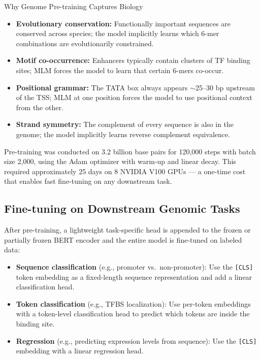 ﻿\documentclass[12pt,a4paper]{article}
\begin{document}
\begin{infobox}{Why Genome Pre-training Captures Biology}
\begin{itemize}[leftmargin=*, itemsep=4pt]
  \item \textbf{Evolutionary conservation:} Functionally important sequences are conserved across species; the model implicitly learns which 6-mer combinations are evolutionarily constrained.
  \item \textbf{Motif co-occurrence:} Enhancers typically contain clusters of TF binding sites; MLM forces the model to learn that certain 6-mers co-occur.
  \item \textbf{Positional grammar:} The TATA box always appears $\sim$25--30 bp upstream of the TSS; MLM at one position forces the model to use positional context from the other.
  \item \textbf{Strand symmetry:} The complement of every sequence is also in the genome; the model implicitly learns reverse complement equivalence.
\end{itemize}
\end{infobox}

Pre-training was conducted on 3.2 billion base pairs for 120,000 steps with batch size 2,000, using the Adam optimizer with warm-up and linear decay. This required approximately 25 days on 8 NVIDIA V100 GPUs --- a one-time cost that enables fast fine-tuning on any downstream task.

\subsection{Fine-tuning on Downstream Genomic Tasks}

After pre-training, a lightweight task-specific head is appended to the frozen or partially frozen BERT encoder and the entire model is fine-tuned on labeled data:

\begin{itemize}[leftmargin=*, itemsep=4pt]
  \item \textbf{Sequence classification} (e.g., promoter vs.\ non-promoter): Use the \texttt{[CLS]} token embedding as a fixed-length sequence representation and add a linear classification head.
  \item \textbf{Token classification} (e.g., TFBS localization): Use per-token embeddings with a token-level classification head to predict which tokens are inside the binding site.
  \item \textbf{Regression} (e.g., predicting expression levels from sequence): Use the \texttt{[CLS]} embedding with a linear regression head.
\end{itemize}
\end{document}
